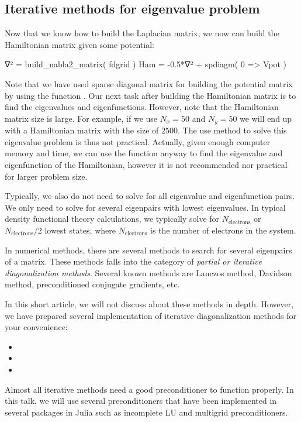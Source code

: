 \subsection{Iterative methods for eigenvalue problem}

Now that we know how to build the Laplacian matrix, we now can build the Hamiltonian
matrix given some potential:
\begin{juliacode}
∇² = build_nabla2_matrix( fdgrid )
Ham = -0.5*∇² + spdiagm( 0 => Vpot )
\end{juliacode}
Note that we have used sparse diagonal matrix for building the potential matrix by
using the function .
Our next task after building the Hamiltonian matrix is to find the eigenvalues
and eigenfunctions.
However, note that the Hamiltonian matrix size is large.
For example, if we use $N_x=50$ and $N_y=50$ we will end up with a Hamiltonian
matrix with the size of $2500$.
The use  method to solve this eigenvalue problem is thus not practical.
Actually, given enough computer memory and time, we can use the function
 anyway
to find the eigenvalue and eigenfunction of the Hamiltonian, however it is not recommended
nor practical for larger problem size.

Typically, we also do not need to solve for all eigenvalue and eigenfunction pairs.
We only need to solve for several eigenpairs with lowest eigenvalues. In typical density
functional theory calculations, we typically solve for $N_{\mathrm{electrons}}$ or
$N_{\mathrm{electrons}}/2$ lowest states, where $N_{\mathrm{electrons}}$ is the number
of electrons in the system.

In numerical methods, there are several methods to search for several eigenpairs
of a matrix. These methods falls into the category of \textit{partial or iterative
diagonalization methods}. Several known methods are Lanczos method, Davidson method,
preconditioned conjugate gradients, etc.

In this short article, we will not discuss about these methods in depth.
However, we have prepared several implementation of iterative diagonalization methods
for your convenience:
\begin{itemize}
\item {}
\item {}
\item {}
\end{itemize}

Almost all iterative methods need a good preconditioner to function properly. In this
talk, we will use several preconditioners that have been implemented in several packages
in Julia such as incomplete LU and multigrid preconditioners.

